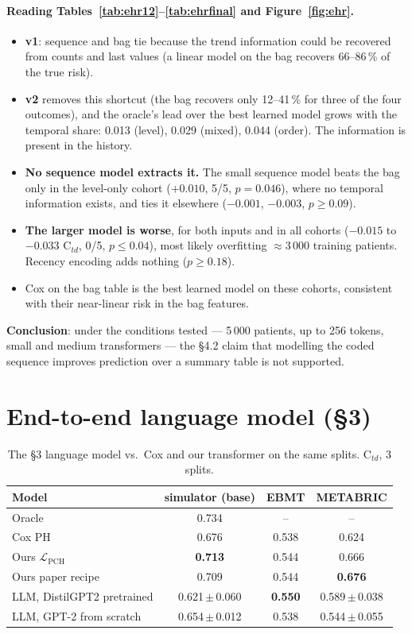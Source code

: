 \documentclass[11pt,a4paper]{article}
\newcommand{\best}[1]{\textbf{#1}}
\newcommand{\Lpch}{$\mathcal{L}_{\mathrm{PCH}}$}
\newcommand{\Ctd}{C$_{td}$}
\begin{document}
\paragraph{Reading Tables~\ref{tab:ehr12}--\ref{tab:ehrfinal} and Figure~\ref{fig:ehr}.}
\begin{itemize}
  \item \textbf{v1}: sequence and bag tie because the trend information could be recovered from counts and last values
        (a linear model on the bag recovers 66--86\,\% of the true risk).
  \item \textbf{v2} removes this shortcut (the bag recovers only 12--41\,\% for three of the four outcomes), and the
        oracle's lead over the best learned model grows with the temporal share: 0.013 (level), 0.029 (mixed),
        0.044 (order). The information is present in the history.
  \item \textbf{No sequence model extracts it.} The small sequence model beats the bag only in the level-only cohort
        ($+0.010$, 5/5, $p=0.046$), where no temporal information exists, and ties it elsewhere ($-0.001$, $-0.003$,
        $p\ge0.09$).
  \item \textbf{The larger model is worse}, for both inputs and in all cohorts ($-0.015$ to $-0.033$ \Ctd{}, 0/5,
        $p\le0.04$), most likely overfitting $\approx$3\,000 training patients. Recency encoding adds nothing
        ($p\ge0.18$).
  \item Cox on the bag table is the best learned model on these cohorts, consistent with their near-linear risk in
        the bag features.
\end{itemize}
\textbf{Conclusion}: under the conditions tested --- 5\,000 patients, up to 256 tokens, small and medium transformers ---
the \S4.2 claim that modelling the coded sequence improves prediction over a summary table is not supported.

\section{End-to-end language model (\S3)}\label{sec:llm}
\begin{table}[H]\centering\small
\caption{The \S3 language model vs.\ Cox and our transformer on the same splits. \Ctd{}, 3 splits.}
\label{tab:llm}
\begin{tabular}{lccc}
\toprule
Model & simulator (base) & EBMT & METABRIC \\
\midrule
Oracle & 0.734 & -- & -- \\
Cox PH & 0.676 & 0.538 & 0.624 \\
Ours \Lpch{} & \best{0.713} & 0.544 & 0.666 \\
Ours paper recipe & 0.709 & 0.544 & \best{0.676} \\
LLM, DistilGPT2 pretrained & 0.621\,$\pm$\,0.060 & \best{0.550} & 0.589\,$\pm$\,0.038 \\
LLM, GPT-2 from scratch & 0.654\,$\pm$\,0.012 & 0.538 & 0.544\,$\pm$\,0.055 \\
\bottomrule
\end{tabular}
\end{table}
\end{document}
